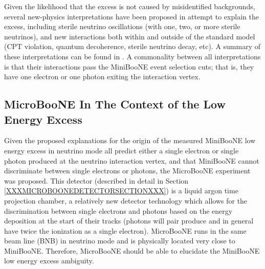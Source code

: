 Given the likelihood that the excess is not caused by misidentified backgrounds, several new-physics interpretations have been proposed in attempt to explain the excess, including sterile neutrino oscillations (with one, two, or more sterile neutrinos), and new interactions both within and outside of the standard model (CPT violation, quantum decoherence, sterile neutrino decay, etc). A summary of these interpretations can be found in \cite{MBLEESourcesOverview}. A commonality between all interpretations is that their interactions pass the MiniBooNE event selection cuts; that is, they have one electron or one photon exiting the interaction vertex.

\subsection{MicroBooNE In The Context of the Low Energy Excess}

Given the proposed explanations for the origin of the measured MiniBooNE low energy excess in neutrino mode all predict either a single electron or single photon produced at the neutrino interaction vertex, and that MiniBooNE cannot discriminate between single electrons or photons, the MicroBooNE experiment was proposed. This detector (described in detail in Section \ref{XXXMICROBOONEDETECTORSECTIONXXX}) is a liquid argon time projection chamber, a relatively new detector technology which allows for the discrimination between single electrons and photons based on the energy deposition at the start of their tracks (photons will pair produce and in general have twice the ionization as a single electron). MicroBooNE runs in the same beam line (BNB) in neutrino mode and is physically located very close to MiniBooNE. Therefore, MicroBooNE should be able to elucidate the MiniBooNE low energy excess ambiguity. \\

